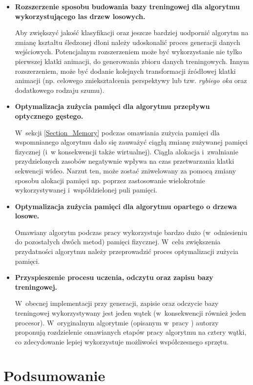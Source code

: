     \begin{itemize}
      \item \textbf{Rozszerzenie sposobu budowania bazy treningowej dla algorytmu wykorzystującego las drzew losowych.}

      Aby zwiększyć jakość klasyfikacji oraz jeszcze bardziej uodpornić algorytm na zmianę kształtu śledzonej dłoni należy udoskonalić proces generacji danych wejściowych. Potencjalnym rozszerzeniem może być wykorzystanie nie tylko pierwszej klatki animacji, do generowania zbioru danych treningowych. Innym rozszerzeniem, może być dodanie kolejnych transformacji źródłowej klatki animacji (np. celowego zniekształcenia perspektywy lub tzw. \textit{rybiego oka} oraz dodatkowego rodzaju szumu).

      \item \textbf{Optymalizacja zużycia pamięci dla algorytmu przepływu optycznego gęstego.}

      W~sekcji \ref{Section_Memory} podczas omawiania zużycia pamięci dla wspomnianego algorytmu dało się zauważyć ciągłą zmianę zużywanej pamięci fizycznej (i~w konsekwencji także wirtualnej). Ciągla alokacja i~zwalnianie przydzielonych zasobów negatywnie wpływa na czas przetwarzania klatki sekwencji wideo. Narzut ten, może zostać zniwelowany za pomocą zmiany sposobu alokacji pamięci np. poprzez zastosowanie wielokrotnie wykorzystywanej i~współdzielonej puli pamięci.

      \item \textbf{Optymalizacja zużycia pamięci dla algorytmu opartego o drzewa losowe.}

      Omawiany algorytm podczas pracy wykorzystuje bardzo dużo (w~odniesieniu do pozostałych dwóch metod) pamięci fizycznej. W~celu zwiększenia przydatności algorytmu należy przeprowadzić proces optymalizacji zużycia pamięci.

      \item \textbf{Przyspieszenie procesu uczenia, odczytu oraz zapisu bazy treningowej.}

       W~obecnej implementacji przy generacji, zapisie oraz odczycie bazy treningowej wykorzystywany jest jeden wątek (w~konsekwencji również jeden procesor). W~oryginalnym algorytmie (opisanym w~pracy \cite{RandomizedTrees06}) autorzy proponują rozdzielenie omawianych etapów pracy algorytmu na cztery wątki, co zdecydowanie lepiej wykorzystuje możliwości współczesnego sprzętu.
    \end{itemize}

\chapter{Podsumowanie}\label{Section_Podsumowanie}

